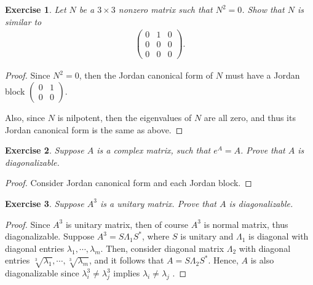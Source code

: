 \documentclass[11pt]{book}
\newtheorem{exercise}{Exercise}[section]
\theoremstyle{definition}
\numberwithin{equation}{chapter}
\begin{document}
\medskip

\begin{exercise}
Let $N$ be a $3 \times 3$ nonzero matrix such that $N^2 = 0$. Show that $N$ is similar to
\begin{align*}
    \begin{pmatrix}
        0 & 1 & 0 \\
        0 & 0 & 0 \\
        0 & 0 & 0
    \end{pmatrix}.
\end{align*}
\end{exercise}
\begin{proof}
Since $N^2 = 0$, then the Jordan canonical form of $N$ must have a Jordan block $\begin{pmatrix}
    0 & 1 \\
    0 & 0 
\end{pmatrix}$.

Also, since $N$ is nilpotent, then the eigenvalues of $N$ are all zero, and thus its Jordan canonical form is the same as above. 
\end{proof}

\medskip

\begin{exercise}
Suppose $A$ is a complex matrix, such that $e^A = A$. Prove that $A$ is diagonalizable.
\end{exercise}
\begin{proof}
Consider Jordan canonical form and each Jordan block.
\end{proof}

\medskip

\begin{exercise}{\bf *}
Suppose $A^3$ is a unitary matrix. Prove that $A$ is diagonalizable.
\end{exercise}
\begin{proof}
Since $A^3$ is unitary matrix, then of course $A^3$ is normal matrix, thus diagonalizable. Suppose $A^3 = S \Lambda_1 S^*$, where $S$ is unitary and $\Lambda_1$ is diagonal with diagonal entries $\lambda_1, \cdots, \lambda_m$. Then, consider diagonal matrix $\Lambda_2$ with diagonal entries $\sqrt[3]{\lambda_1}, \cdots, \sqrt[3]{\lambda_m}$, and it follows that $A = S \Lambda_2 S^*$. Hence, $A$ is also diagonalizable since $\lambda_i^3 \neq \lambda_j^3$ implies $\lambda_i \neq \lambda_j$ \cite{22}.
\end{proof}

\medskip
\end{document}
